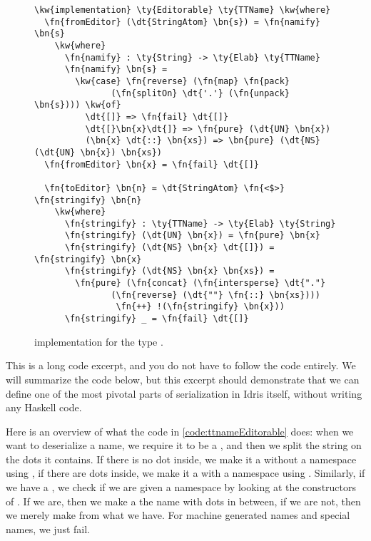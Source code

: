 \begin{figure}[ht]
\begin{Verbatim}[framesep=2mm, label=\footnotesize{\normalfont{Idris}}, labelposition=topline]
\kw{implementation} \ty{Editorable} \ty{TTName} \kw{where}
  \fn{fromEditor} (\dt{StringAtom} \bn{s}) = \fn{namify} \bn{s}
    \kw{where}
      \fn{namify} : \ty{String} -> \ty{Elab} \ty{TTName}
      \fn{namify} \bn{s} =
        \kw{case} \fn{reverse} (\fn{map} \fn{pack}
               (\fn{splitOn} \dt{'.'} (\fn{unpack} \bn{s}))) \kw{of}
          \dt{[]} => \fn{fail} \dt{[]}
          \dt{[}\bn{x}\dt{]} => \fn{pure} (\dt{UN} \bn{x})
          (\bn{x} \dt{::} \bn{xs}) => \bn{pure} (\dt{NS} (\dt{UN} \bn{x}) \bn{xs})
  \fn{fromEditor} \bn{x} = \fn{fail} \dt{[]}

  \fn{toEditor} \bn{n} = \dt{StringAtom} \fn{<$>} \fn{stringify} \bn{n}
    \kw{where}
      \fn{stringify} : \ty{TTName} -> \ty{Elab} \ty{String}
      \fn{stringify} (\dt{UN} \bn{x}) = \fn{pure} \bn{x}
      \fn{stringify} (\dt{NS} \bn{x} \dt{[]}) = \fn{stringify} \bn{x}
      \fn{stringify} (\dt{NS} \bn{x} \bn{xs}) =
        \fn{pure} (\fn{concat} (\fn{intersperse} \dt{"."}
               (\fn{reverse} (\dt{""} \fn{::} \bn{xs})))
                \fn{++} !(\fn{stringify} \bn{x}))
      \fn{stringify} _ = \fn{fail} \dt{[]}
\end{Verbatim}
\caption{ implementation for the type .}
\label{code:ttnameEditorable}
\end{figure}

This is a long code excerpt, and you do not have to follow the code entirely.
We will summarize the code below, but this excerpt should demonstrate that
we can define one of the most pivotal parts of serialization in Idris itself,
without writing any Haskell code.

Here is an overview of what the code in \autoref{code:ttnameEditorable} does:
when we want to deserialize a name, we require it to be a , and
then we split the string  on the dots it contains. If there is no dot
inside, we make it a  without a namespace using , if there
are dots inside, we make it a  with a namespace using .
Similarly, if we have a , we check if we are given a namespace by
looking at the constructors of . If we are, then we make a
 the name with dots in between, if we are not, then we merely make
 from what we have.
For machine generated names and special names, we just fail.

